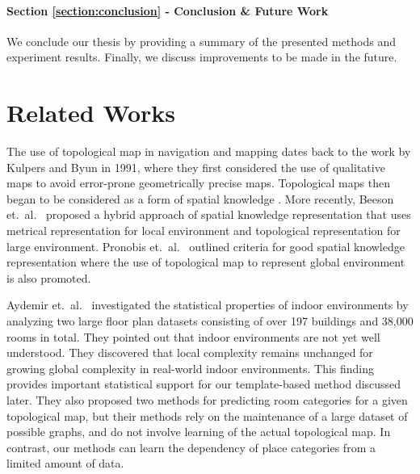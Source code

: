 \documentclass[11pt, titlepage]{article}
\theoremstyle{definition}
\begin{document}
\paragraph{Section \ref{section:conclusion} - Conclusion \& Future Work} We conclude our thesis by providing a summary of the presented methods and experiment results. Finally, we discuss improvements to be made in the future.


\newpage
\section{Related Works}\label{section:related}

The use of topological map in navigation and mapping dates back to the work by Kulpers and Byun \cite{kuipers1991robot} in 1991, where they first considered the use of qualitative maps to avoid error-prone geometrically precise maps. Topological maps then began to be considered as a form of spatial knowledge \cite{kuipers2000spatial}. More recently, Beeson et.~al.~\cite{beeson2010factoring} proposed a hybrid approach of spatial knowledge representation that uses metrical representation for local environment and topological representation for large environment. Pronobis et.~al.~\cite{pronobis2010representing} outlined criteria for good spatial knowledge representation where the use of topological map to represent global environment is also promoted.

Aydemir et.~al.~\cite{aydemir2012can} investigated the statistical properties of indoor environments by analyzing two large floor plan datasets consisting of over 197 buildings and 38,000 rooms in total. They pointed out that indoor environments are not yet well understood. They discovered that local complexity remains unchanged for growing global complexity in real-world indoor environments. This finding provides important statistical support for our template-based method discussed later. They also proposed two methods for predicting room categories for a given topological map, but their methods rely on the maintenance of a large dataset of possible graphs, and do not involve learning of the actual topological map. In contrast, our methods can learn the dependency of place categories from a limited amount of data.
\end{document}
